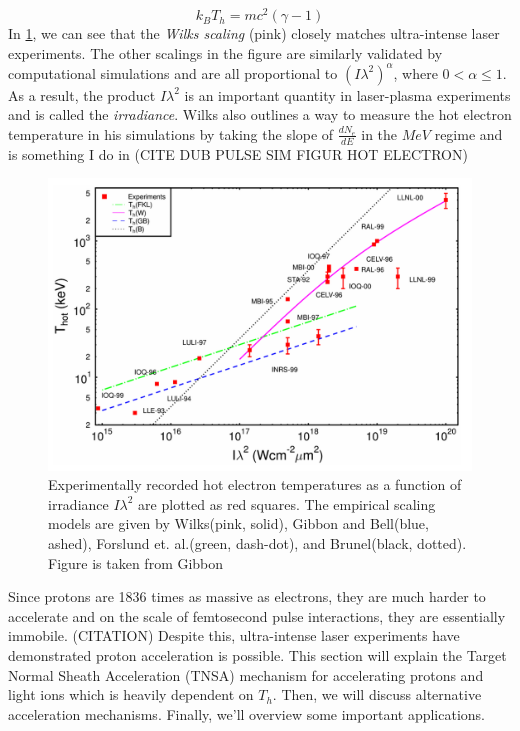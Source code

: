 \begin{equation}
	k_B T_h = m c^2 (\gamma - 1) \label{eq:wilks}
\end{equation}
In \cref{fig:electron_scaling}, we can see that the \emph{Wilks scaling} (pink) closely matches ultra-intense laser experiments. The other scalings in the figure are similarly validated by computational simulations and are all proportional to $(I \lambda^2)^\alpha$, where $0 < \alpha \leq 1$. As a result, the product $I \lambda^2$ is an important quantity in laser-plasma experiments and is called the \emph{irradiance}. Wilks also outlines a way to measure the hot electron temperature in his simulations\cite{Wilks_1992_PRL} by taking the slope of $\frac{dN_e}{dE}$ in the $MeV$ regime and is something I do in (CITE DUB PULSE SIM FIGUR HOT ELECTRON)

\begin{figure}
	\centering 
	\includegraphics[width=0.75\linewidth]{planning/images/gibbon_hot_electron.PNG}
	\caption{Experimentally recorded hot electron temperatures as a function of irradiance $I \lambda^2$ are plotted as red squares. The empirical scaling models are given by Wilks\cite{Wilks_1992_PRL}(pink, solid), Gibbon and Bell\cite{Gibbon_1992_PRL}(blue, ashed), Forslund et. al.\cite{Forslund_1977_PRL}(green, dash-dot), and Brunel\cite{Brunel_1987_PRL}(black, dotted). Figure is taken from Gibbon\cite{Gibbon_2005_Plasma}}
	\label{fig:electron_scaling}
\end{figure}

Since protons are 1836 times as massive as electrons, they are much harder to accelerate and on the scale of femtosecond pulse interactions, they are essentially immobile. (CITATION) Despite this, ultra-intense laser experiments have demonstrated proton acceleration is possible. This section will explain the Target Normal Sheath Acceleration (TNSA) mechanism for accelerating protons and light ions which is heavily dependent on $T_h$. Then, we will discuss alternative acceleration mechanisms. Finally, we'll overview some important applications.

